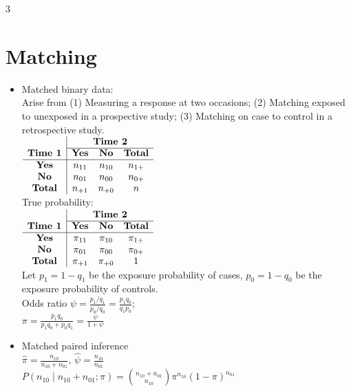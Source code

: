 \documentclass[a4paper,10pt]{article}
\begin{document}
\begin{multicols}{3}
\section*{Matching}
\begin{itemize}
    \item Matched binary data:\\
    Arise from (1) Measuring a response at two occasions; (2) Matching exposed to unexposed in a prospective study; (3) Matching on case to control in a retrospective study.\\
    $\begin{array}{c|ccc}
        & \multicolumn{3}{c}{\textbf{Time 2}} \\
        \cline{2-4}
        \textbf{Time 1} & \textbf{Yes} & \textbf{No} & \textbf{Total} \\
        \hline
        \textbf{Yes} & n_{11} & n_{10} & n_{1+} \\
        \textbf{No} & n_{01} & n_{00} & n_{0+} \\
        \textbf{Total} & n_{+1} & n_{+0} & n \\
    \end{array}$\\
    True probability:\\
    $\begin{array}{c|ccc}
        & \multicolumn{3}{c}{\textbf{Time 2}} \\
        \cline{2-4}
        \textbf{Time 1} & \textbf{Yes} & \textbf{No} & \textbf{Total} \\
        \hline
        \textbf{Yes} & \pi_{11} & \pi_{10} & \pi_{1+} \\
        \textbf{No} & \pi_{01} & \pi_{00} & \pi_{0+} \\
        \textbf{Total} & \pi_{+1} & \pi_{+0} & 1 \\
    \end{array}$\\
    Let $p_1=1-q_1$ be the exposure probability of cases, $p_0=1-q_0$ be the exposure probability of controls.\\ Odds ratio $\psi = \frac{p_1/q_1}{p_0/q_0} = \frac{p_1 q_0}{q_1 p_0}$;\\
    $\pi = \frac{p_1 q_0}{p_1 q_0 + p_0 q_1} = \frac{\psi}{1 + \psi}$
    \item Matched paired inference\\
    $\hat{\pi} = \frac{n_{10}}{n_{10} + n_{01}}$, $\hat{\psi} = \frac{n_{10}}{n_{01}}$ \\
    $P(n_{10} \mid n_{10} + n_{01}; \pi) = \binom{n_{10} + n_{01}}{n_{10}} \pi^{n_{10}} (1 - \pi)^{n_{01}}$\\

\end{itemize}
\end{multicols}
\end{document}
